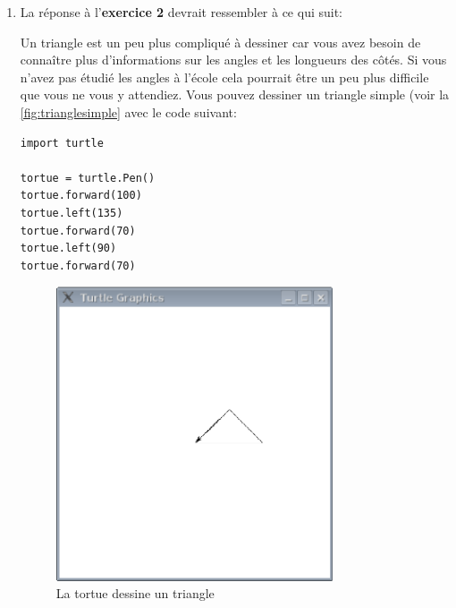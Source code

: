 \begin{enumerate}
\item La réponse à l'\textbf{exercice 2} devrait ressembler à ce qui suit:

Un triangle est un peu plus compliqué à dessiner car vous avez besoin de connaître plus d'informations sur les angles et les longueurs des côtés. Si vous n'avez pas étudié les angles à l'école cela pourrait être un peu plus difficile que vous ne vous y attendiez. Vous pouvez dessiner un triangle simple (voir la \autoref{fig:trianglesimple} avec le code suivant:

\begin{Verbatim}[frame=single,rulecolor=\color{mbleu}, label=à taper]
import turtle

tortue = turtle.Pen()
tortue.forward(100)
tortue.left(135)
tortue.forward(70)
tortue.left(90)
tortue.forward(70)
\end{Verbatim}

\begin{figure}[h!t]
\begin{center}
\includegraphics[width=82mm]{images/trianglesimple.eps}
\end{center}
\caption{La tortue dessine un triangle}\label{fig:trianglesimple}
\end{figure}

\end{enumerate}


